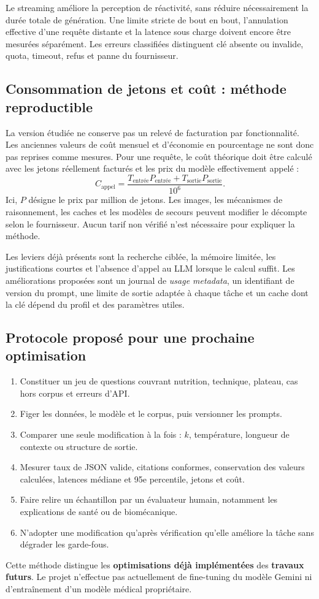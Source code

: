 \documentclass[11pt,a4paper]{article}
\begin{document}
Le streaming améliore la perception de réactivité, sans réduire nécessairement la durée totale de génération. Une limite stricte de bout en bout, l'annulation effective d'une requête distante et la latence sous charge doivent encore être mesurées séparément. Les erreurs classifiées distinguent clé absente ou invalide, quota, timeout, refus et panne du fournisseur.

\clearpage
\subsection{Consommation de jetons et coût : méthode reproductible}
La version étudiée ne conserve pas un relevé de facturation par fonctionnalité. Les anciennes valeurs de coût mensuel et d'économie en pourcentage ne sont donc pas reprises comme mesures. Pour une requête, le coût théorique doit être calculé avec les jetons réellement facturés et les prix du modèle effectivement appelé :
\[
C_{\text{appel}}=\frac{T_{\text{entrée}} P_{\text{entrée}}+T_{\text{sortie}} P_{\text{sortie}}}{10^6}.
\]
Ici, \(P\) désigne le prix par million de jetons. Les images, les mécanismes de raisonnement, les caches et les modèles de secours peuvent modifier le décompte selon le fournisseur. Aucun tarif non vérifié n'est nécessaire pour expliquer la méthode.

Les leviers déjà présents sont la recherche ciblée, la mémoire limitée, les justifications courtes et l'absence d'appel au LLM lorsque le calcul suffit. Les améliorations proposées sont un journal de \textit{usage metadata}, un identifiant de version du prompt, une limite de sortie adaptée à chaque tâche et un cache dont la clé dépend du profil et des paramètres utiles.

\subsection{Protocole proposé pour une prochaine optimisation}
\begin{enumerate}
\item Constituer un jeu de questions couvrant nutrition, technique, plateau, cas hors corpus et erreurs d'API.
\item Figer les données, le modèle et le corpus, puis versionner les prompts.
\item Comparer une seule modification à la fois : \(k\), température, longueur de contexte ou structure de sortie.
\item Mesurer taux de JSON valide, citations conformes, conservation des valeurs calculées, latences médiane et 95e percentile, jetons et coût.
\item Faire relire un échantillon par un évaluateur humain, notamment les explications de santé ou de biomécanique.
\item N'adopter une modification qu'après vérification qu'elle améliore la tâche sans dégrader les garde-fous.
\end{enumerate}
Cette méthode distingue les \textbf{optimisations déjà implémentées} des \textbf{travaux futurs}. Le projet n'effectue pas actuellement de fine-tuning du modèle Gemini ni d'entraînement d'un modèle médical propriétaire.
\end{document}
